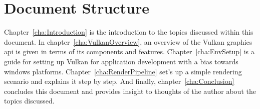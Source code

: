 



  \section{Document Structure}
    Chapter~\ref{cha:Introduction} is the introduction to the topics discussed within this document.
    In chapter~\ref{cha:VulkanOverview}, an overview of the Vulkan graphics \gls{api} is given in terms of its components and features.
    Chapter~\ref{cha:EnvSetup} is a guide for setting up Vulkan for application development with a bias towards \gls{windows} platforms.
    Chapter~\ref{cha:RenderPipeline} set's up a simple rendering scenario and explains it step by step.
    And finally, chapter~\ref{cha:Conclusion} concludes this document and provides insight to thoughts of the author about the topics discussed.

